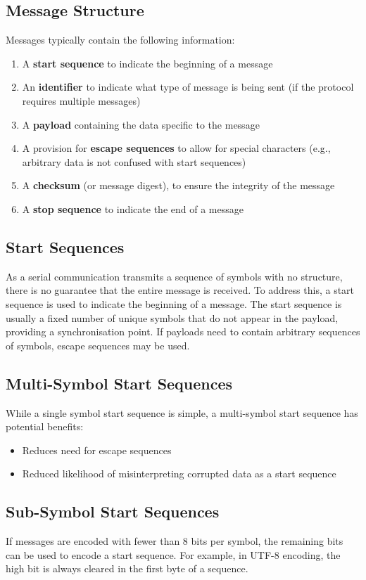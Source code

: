 \documentclass[a4paper]{report}
\begin{document}
\subsection{Message Structure}
Messages typically contain the following information:
\begin{enumerate}
    \item A \textbf{start sequence} to indicate the beginning of a message
    \item An \textbf{identifier} to indicate what type of message is being sent (if the protocol requires multiple messages)
    \item A \textbf{payload} containing the data specific to the message
    \item A provision for \textbf{escape sequences} to allow for special characters (e.g., arbitrary data is not confused with start sequences)
    \item A \textbf{checksum} (or message digest), to ensure the integrity of the message
    \item A \textbf{stop sequence} to indicate the end of a message
\end{enumerate}
\subsection{Start Sequences}
As a serial communication transmits a sequence of symbols with no structure,
there is no guarantee that the entire message is received.
To address this, a start sequence is used to indicate
the beginning of a message. The start sequence is usually a fixed number of unique symbols
that do not appear in the payload, providing a synchronisation point. If payloads need to contain
arbitrary sequences of symbols, escape sequences may be used.
\subsection{Multi-Symbol Start Sequences}
While a single symbol start sequence is simple, a multi-symbol start sequence has potential benefits:
\begin{itemize}
    \item Reduces need for escape sequences
    \item Reduced likelihood of misinterpreting corrupted data as a start sequence
\end{itemize}
\subsection{Sub-Symbol Start Sequences}
If messages are encoded with fewer than 8 bits per symbol, the remaining bits can be used to encode
a start sequence. For example, in UTF-8 encoding, the high bit is always cleared in the first byte of a
sequence.
\end{document}

